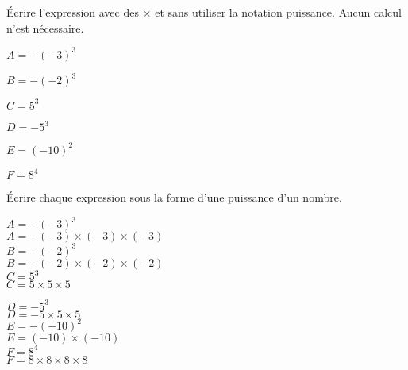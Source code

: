 \begin{exercice*}
    Écrire l'expression avec des $\times$ et sans utiliser la notation puissance. Aucun calcul n'est nécessaire.
    \begin{multicols}{2}
        \begin{itemize}
            \begin{spacing}{1.5}
                \item[] $A=-(-3)^{3}$
                \item[] $B=-(-2)^{3}$
                \item[] $C=5^{3}$
                \item[] $D=-5^{3}$
                \item[] $E=(-10)^{2}$
                \item[] $F=8^{4}$
            \end{spacing}
        \end{itemize}
    \end{multicols}
\end{exercice*}
\begin{corrige}
    Écrire chaque expression sous la forme d'une puissance d'un nombre.
    \begin{spacing}{1.5}
    \begin{minipage}{0.55\linewidth}
        $A=-(-3)^{3}$\\        
        {\red $A=-(-3)\times(-3)\times(-3)$}\\
        $B=-(-2)^{3}$\\        
        {\red $B=-(-2)\times(-2)\times(-2)$}\\
        $C=5^{3}$\\        
        {\red $C=5\times 5\times 5$}\\
    \end{minipage}
    \begin{minipage}{0.35\linewidth}
        $D=-5^{3}$\\        
        {\red $D=-5\times 5\times 5$}\\
        $E=-(-10)^{2}$\\        
        {\red $E= (-10)\times (-10)$}\\
        $F=8^{4}$\\
        {\red $F= 8\times 8\times 8\times 8$}
    \end{minipage}
    \end{spacing}
\end{corrige}